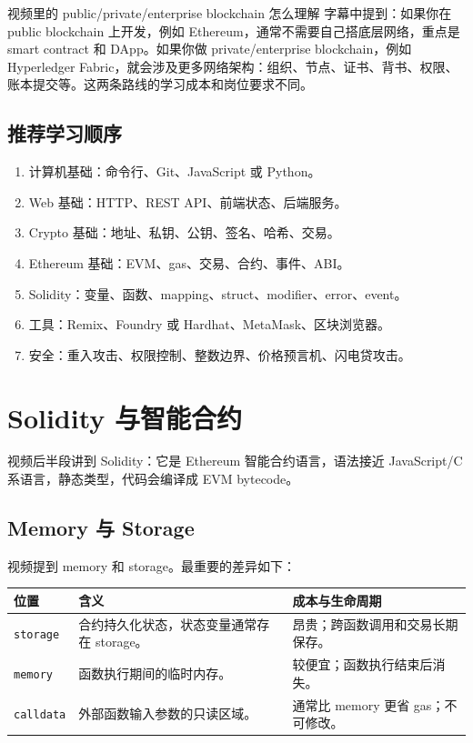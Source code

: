 \documentclass[UTF8,11pt]{ctexart}
\begin{document}
\begin{keybox}{视频里的 public/private/enterprise blockchain 怎么理解}
字幕中提到：如果你在 public blockchain 上开发，例如 Ethereum，通常不需要自己搭底层网络，重点是 smart contract 和 DApp。如果你做 private/enterprise blockchain，例如 Hyperledger Fabric，就会涉及更多网络架构：组织、节点、证书、背书、权限、账本提交等。这两条路线的学习成本和岗位要求不同。
\end{keybox}

\subsection{推荐学习顺序}

\begin{enumerate}
  \item 计算机基础：命令行、Git、JavaScript 或 Python。
  \item Web 基础：HTTP、REST API、前端状态、后端服务。
  \item Crypto 基础：地址、私钥、公钥、签名、哈希、交易。
  \item Ethereum 基础：EVM、gas、交易、合约、事件、ABI。
  \item Solidity：变量、函数、mapping、struct、modifier、error、event。
  \item 工具：Remix、Foundry 或 Hardhat、MetaMask、区块浏览器。
  \item 安全：重入攻击、权限控制、整数边界、价格预言机、闪电贷攻击。
\end{enumerate}

\section{Solidity 与智能合约}
\label{sec:solidity}

视频后半段讲到 Solidity：它是 Ethereum 智能合约语言，语法接近 JavaScript/C 系语言，静态类型，代码会编译成 EVM bytecode。

\subsection{Memory 与 Storage}

视频提到 memory 和 storage。最重要的差异如下：

\begin{longtable}{>{\raggedright\arraybackslash}p{3cm}>{\raggedright\arraybackslash}p{5.8cm}>{\raggedright\arraybackslash}p{5.8cm}}
\toprule
\textbf{位置} & \textbf{含义} & \textbf{成本与生命周期} \\
\midrule
\endhead
\texttt{storage} & 合约持久化状态，状态变量通常存在 storage。 & 昂贵；跨函数调用和交易长期保存。 \\
\texttt{memory} & 函数执行期间的临时内存。 & 较便宜；函数执行结束后消失。 \\
\texttt{calldata} & 外部函数输入参数的只读区域。 & 通常比 memory 更省 gas；不可修改。 \\
\bottomrule
\end{longtable}
\end{document}
